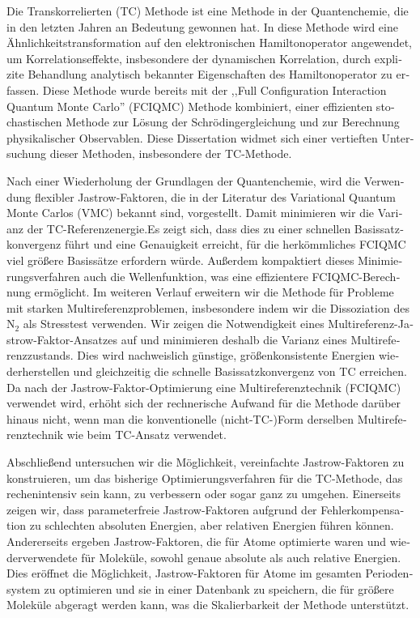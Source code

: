 \cleardoublepage
\begin{otherlanguage}{ngerman}

Die Transkorrelierten (TC) Methode ist eine Methode in der Quantenchemie, die in den letzten Jahren an Bedeutung gewonnen hat. In diese Methode wird eine Ähnlichkeitstransformation auf den elektronischen Hamiltonoperator angewendet, um Korrelationseffekte, insbesondere der dynamischen Korrelation, durch explizite Behandlung analytisch bekannter Eigenschaften des Hamiltonoperator zu erfassen. Diese Methode wurde bereits mit der ,,Full Configuration Interaction Quantum Monte Carlo'' (FCIQMC) Methode kombiniert, einer effizienten stochastischen Methode zur Lösung der Schrödingergleichung und zur Berechnung physikalischer Observablen. Diese Dissertation widmet sich einer vertieften Untersuchung dieser Methoden, insbesondere der TC-Methode.

Nach einer Wiederholung der Grundlagen der Quantenchemie, wird die Verwendung flexibler Jastrow-Faktoren, die in der Literatur des Variational Quantum Monte Carlos (VMC) bekannt sind, vorgestellt. Damit minimieren wir die Varianz der TC-Referenzenergie.Es zeigt sich, dass dies zu einer schnellen Basissatzkonvergenz führt und eine Genauigkeit erreicht, für die herkömmliches FCIQMC viel größere Basissätze erfordern würde. Außerdem kompaktiert dieses Minimierungsverfahren auch die Wellenfunktion, was eine effizientere FCIQMC-Berechnung ermöglicht. Im weiteren Verlauf erweitern wir die Methode für Probleme mit starken Multireferenzproblemen, insbesondere indem wir die Dissoziation des N$_2$ als Stresstest verwenden. Wir zeigen die Notwendigkeit eines Multireferenz-Jastrow-Faktor-Ansatzes auf und minimieren deshalb die Varianz eines Multireferenzzustands. Dies wird nachweislich günstige, größenkonsistente Energien wiederherstellen und gleichzeitig die schnelle Basissatzkonvergenz von TC erreichen. Da nach der Jastrow-Faktor-Optimierung eine Multireferenztechnik (FCIQMC) verwendet wird, erhöht sich der rechnerische Aufwand für die Methode darüber hinaus nicht, wenn man die konventionelle (nicht-TC-)Form derselben Multireferenztechnik wie beim TC-Ansatz verwendet.

Abschließend untersuchen wir die Möglichkeit, vereinfachte Jastrow-Faktoren zu konstruieren, um das bisherige Optimierungsverfahren für die TC-Methode, das rechenintensiv sein kann, zu verbessern oder sogar ganz zu umgehen. Einerseits zeigen wir, dass parameterfreie Jastrow-Faktoren aufgrund der Fehlerkompensation zu schlechten absoluten Energien, aber relativen Energien führen können. Andererseits ergeben Jastrow-Faktoren, die für Atome optimierte waren und wiederverwendete für Moleküle, sowohl genaue absolute als auch relative Energien. Dies eröffnet die Möglichkeit, Jastrow-Faktoren für Atome im gesamten Periodensystem zu optimieren und sie in einer Datenbank zu speichern, die für größere Moleküle abgeragt werden kann, was die Skalierbarkeit der Methode unterstützt.

\end{otherlanguage}

